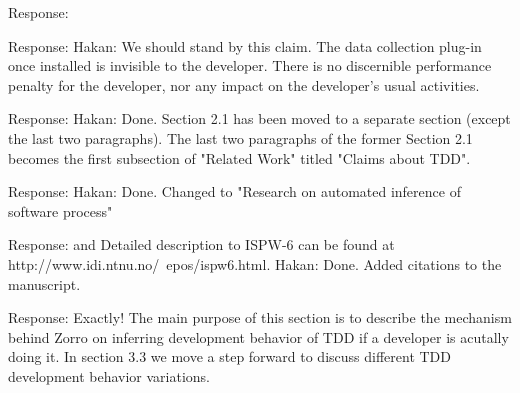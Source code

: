\documentclass[11pt]{article}
\begin{document}

\noindent Response: \cite{csdl2-07-04}


\noindent Response: Hakan: We should stand by this claim. The data collection plug-in once installed is invisible to the developer. There is no discernible performance penalty for the developer, nor any impact on the developer's usual activities. 


\noindent Response: Hakan: Done. Section 2.1 has been moved to a separate section (except the last two paragraphs). The last two paragraphs of the former Section 2.1 becomes the first subsection of "Related Work" titled "Claims about TDD".



\noindent Response: Hakan: Done. Changed to "Research on automated inference of software process"


\noindent Response: \cite{ispw6} and \cite{Hackystat:06,csdl2-04-11,csdl2-04-22,csdl2-03-12} Detailed description to ISPW-6 can be found at http://www.idi.ntnu.no/~epos/ispw6.html. Hakan: Done. Added citations to the manuscript. 


\noindent Response: Exactly! The main purpose of this section is to describe the mechanism behind Zorro on inferring development behavior of TDD if a developer is acutally doing it. In section 3.3 we move a step forward to discuss different
TDD development behavior variations. 
\end{document}
